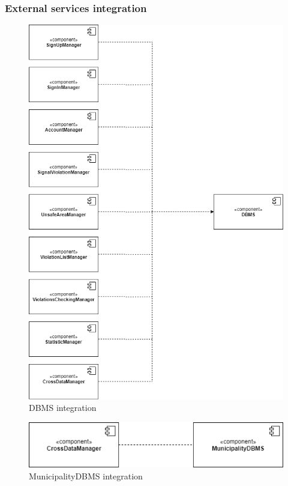         \subsubsection{External services integration}    
            \begin{figure}[H]
                \includegraphics[scale=0.5]{dd/resources/images/Integration-DBMS.png}
                \caption{DBMS integration}        
            \end{figure}
            \begin{figure}[H]
                \includegraphics[scale=0.7]{dd/resources/images/Integration-MunicipalityDBMS.png}
                \caption{MunicipalityDBMS integration}        
            \end{figure}
